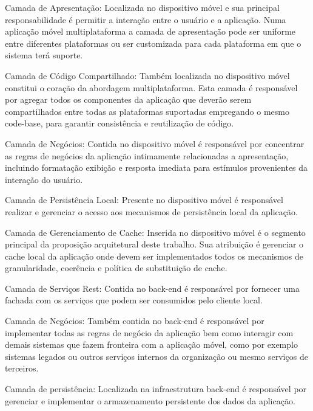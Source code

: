 \documentclass[
	article,			%
	11pt,				%
	oneside,			%
	a4paper,			%
	english,			%
	brazil,				%
	sumario=tradicional
]{abntex2}
\begin{document}
\begin{description}
	\item Camada de Apresentação:
	Localizada no dispositivo móvel e sua principal responsabilidade é permitir a interação entre o usuário e a aplicação.
	Numa aplicação móvel multiplataforma a camada de apresentação pode ser uniforme entre diferentes plataformas ou ser customizada para cada plataforma em que o sistema terá suporte.
	\item Camada de Código Compartilhado:
	Também localizada no dispositivo móvel constitui o coração da abordagem multiplataforma. Esta camada é responsável por agregar todos os componentes da aplicação que deverão serem compartilhados entre todas as plataformas suportadas empregando o mesmo code-base, para garantir consistência e reutilização de código.
	\begin{description}
		\item Camada de Negócios:
		Contida no dispositivo móvel é responsável por concentrar as regras de negócios da aplicação intimamente relacionadas a apresentação, incluindo formatação exibição e resposta imediata para estímulos provenientes da interação do usuário.
		\item Camada de Persistência Local: 
		Presente no dispositivo móvel é responsável realizar e gerenciar o acesso aos mecanismos de persistência local da aplicação.
		\item Camada de Gerenciamento de Cache:
		Inserida no dispositivo móvel é o segmento principal da proposição arquitetural deste trabalho. Sua atribuição é gerenciar o cache local da aplicação onde devem ser implementados todos os mecanismos de granularidade, coerência e política de substituição de cache.
	\end{description}
	\item Camada de Serviços Rest:
	Contida no \gls{back-end} é responsável por fornecer uma fachada com os serviços que podem ser consumidos pelo cliente local.
	\item Camada de Negócios:
	Também contida no \gls{back-end} é responsável por implementar todas as regras de negócio da aplicação bem como interagir com demais sistemas que fazem fronteira com a aplicação móvel, como por exemplo sistemas legados ou outros serviços internos da organização ou mesmo serviços de terceiros.
	\item Camada de persistência:
	Localizada na infraestrutura \gls{back-end} é responsável por gerenciar e implementar o armazenamento persistente dos dados da aplicação.
\end{description}
\end{document}
